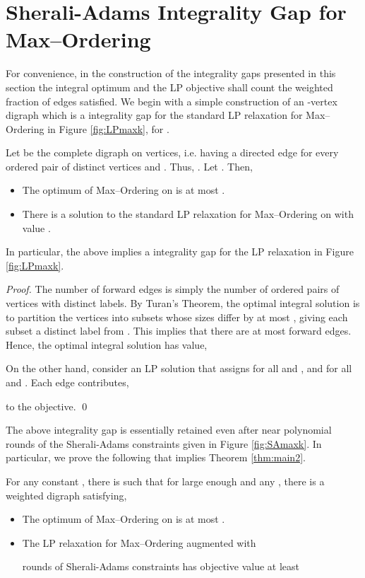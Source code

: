 \documentclass[oribibl]{llncs}
\newcommand{\maxk}{{\sc Max--Ordering}\xspace}
\begin{document}
\section{Sherali-Adams Integrality Gap for \maxk}
\label{sec:integrality-gaps}
For convenience, in the construction of the integrality gaps presented
in this section the
integral optimum and the LP objective shall count the weighted
fraction of edges satisfied.
We begin with a simple construction of an -vertex digraph which is
a  integrality gap
for the standard LP relaxation for \maxk in Figure \ref{fig:LPmaxk},
for . 
\begin{cl}\label{claim:int}
Let  be the complete digraph on  vertices, i.e. having
a directed edge for every ordered pair  of distinct vertices
 and . Thus, . Let
. Then,
\begin{itemize}
	\item The optimum of \maxk on  is at most 
		. 
	\item There is a solution to the standard LP relaxation for
		\maxk on  with value . 
\end{itemize}
In particular, the above implies a  
integrality gap
for the LP relaxation in Figure \ref{fig:LPmaxk}.
\end{cl}
\begin{proof}
The number of forward edges is simply the number of ordered pairs of vertices
 with distinct labels.
By Turan's Theorem, 
the optimal integral solution is to partition the vertices into 
subsets whose sizes differ by at most , giving each subset a distinct 
label from . This implies that there are at most 
 forward edges. Hence, the optimal integral solution
has value, 

On the other
hand, consider an  LP solution that assigns  for all
 and , and  for all
 and . Each edge  
contributes,

to the objective. \qed
\end{proof}
The above integrality gap is essentially 
retained even after near polynomial rounds of the Sherali-Adams constraints
given in Figure \ref{fig:SAmaxk}. In particular, we prove the
following that implies Theorem \ref{thm:main2}.
\begin{theorem}\label{thm:main2restated}
	For any constant , there is  such that
	for large enough  and any , 
	there is a weighted digraph 
	satisfying,
	\begin{itemize}
		\item The optimum of \maxk on  is at most 
		.
		\item The LP relaxation for \maxk augmented with
			 
			rounds of Sherali-Adams constraints
			has objective value at least 
	\end{itemize}
\end{theorem}
\end{document}
